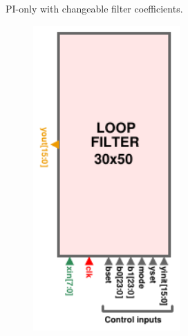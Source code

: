 \documentclass[t, screen, aspectratio=43]{beamer}
\begin{document}
\begin{frame}
\begin{block}{PI-only with changeable filter coefficients.}
\begin{minipage}{6cm}
		\end{minipage}%
		\begin{minipage}{6cm}
			\begin{figure}[htb!]
			        \centering
			        \includegraphics[width=0.5\textwidth, angle=0]{lf_pin_plan}
			\end{figure}
		\end{minipage}%

	\end{block}	
\end{frame}
\end{document}
